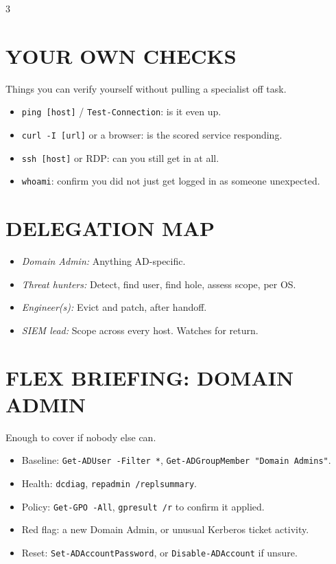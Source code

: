 \documentclass[7pt,landscape]{article}
\begin{document}
\begin{multicols*}{3}
\section{YOUR OWN CHECKS}
Things you can verify yourself without pulling a specialist off task.
\begin{itemize}
    \item \texttt{ping [host]} / \texttt{Test-Connection}: is it even up.
    \item \texttt{curl -I [url]} or a browser: is the scored service responding.
    \item \texttt{ssh [host]} or RDP: can you still get in at all.
    \item \texttt{whoami}: confirm you did not just get logged in as someone unexpected.
\end{itemize}

\section{DELEGATION MAP}
\begin{itemize}
    \item \textit{Domain Admin:} Anything AD-specific.
    \item \textit{Threat hunters:} Detect, find user, find hole, assess scope, per OS.
    \item \textit{Engineer(s):} Evict and patch, after handoff.
    \item \textit{SIEM lead:} Scope across every host. Watches for return.
\end{itemize}

\section{FLEX BRIEFING: DOMAIN ADMIN}
Enough to cover if nobody else can.
\begin{itemize}
    \item Baseline: \texttt{Get-ADUser -Filter *}, \newline \texttt{Get-ADGroupMember "Domain Admins"}.
    \item Health: \texttt{dcdiag}, \texttt{repadmin /replsummary}.
    \item Policy: \texttt{Get-GPO -All}, \texttt{gpresult /r} to confirm it applied.
    \item Red flag: a new Domain Admin, or unusual Kerberos ticket activity.
    \item Reset: \texttt{Set-ADAccountPassword}, \newline or \texttt{Disable-ADAccount} if unsure.
\end{itemize}


\end{multicols*}
\end{document}
